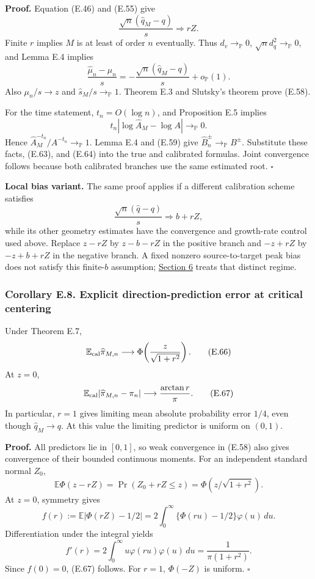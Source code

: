 \textbf{Proof.} Equation (E.46) and (E.55) give \[
\frac{\sqrt n(\widehat q_M-q)}s\Rightarrow rZ.
\tag{E.63}
\] Finite \(r\) implies \(M\) is at least of order \(n\) eventually.
Thus \(d_v\to_{\mathbb P}0\), \(\sqrt n d_q^2\to_{\mathbb P}0\), and
Lemma E.4 implies \[
\frac{\widehat\mu_n-\mu_n}s
=-\frac{\sqrt n(\widehat q_M-q)}s+o_{\mathbb P}(1).
\tag{E.64}
\] Also \(\mu_n/s\to z\) and \(\widehat s_M/s\to_{\mathbb P}1\). Theorem
E.3 and Slutsky's theorem prove (E.58).

For the time statement, \(t_n=O(\log n)\), and Proposition E.5 implies
\[
t_n|\log\widehat A_M-\log A|\to_{\mathbb P}0.
\] Hence \(\widehat A_M^{-t_n}/A^{-t_n}\to_{\mathbb P}1\). Lemma E.4 and
(E.59) give \(\widehat B_n^\pm\to_{\mathbb P}B^\pm\). Substitute these
facts, (E.63), and (E.64) into the true and calibrated formulas. Joint
convergence follows because both calibrated branches use the same
estimated root. \(\square\)

\textbf{Local bias variant.} The same proof applies if a different
calibration scheme satisfies \[
\frac{\sqrt n(\widehat q-q)}s\Rightarrow b+rZ,
\tag{E.65}
\] while its other geometry estimates have the convergence and
growth-rate control used above. Replace \(z-rZ\) by \(z-b-rZ\) in the
positive branch and \(-z+rZ\) by \(-z+b+rZ\) in the negative branch. A
fixed nonzero source-to-target peak bias does not satisfy this
finite-\(b\) assumption; \href{risk_boundaries.md}{Section 6} treats
that distinct regime.

\subsubsection{Corollary E.8. Explicit direction-prediction error at
critical
centering}\label{calibration-corollary-e.8.-explicit-direction-prediction-error-at-critical-centering}

Under Theorem E.7, \[
\mathbb E_{\rm cal}\widehat\pi_{M,n}
\longrightarrow
\Phi\!\left(\frac z{\sqrt{1+r^2}}\right).
\tag{E.66}
\] At \(z=0\), \[
\mathbb E_{\rm cal}|\widehat\pi_{M,n}-\pi_n|
\longrightarrow\frac{\arctan r}{\pi}.
\tag{E.67}
\] In particular, \(r=1\) gives limiting mean absolute probability error
\(1/4\), even though \(\widehat q_M\to q\). At this value the limiting
predictor is uniform on \((0,1)\).

\textbf{Proof.} All predictors lie in \([0,1]\), so weak convergence in
(E.58) also gives convergence of their bounded continuous moments. For
an independent standard normal \(Z_0\), \[
\mathbb E\Phi(z-rZ)
=\Pr(Z_0+rZ\le z)
=\Phi(z/\sqrt{1+r^2}).
\] At \(z=0\), symmetry gives \[
f(r):=\mathbb E|\Phi(rZ)-1/2|
=2\int_0^\infty\{\Phi(ru)-1/2\}\varphi(u)\,du.
\] Differentiation under the integral yields \[
f'(r)=2\int_0^\infty u\varphi(ru)\varphi(u)\,du
=\frac1{\pi(1+r^2)}.
\] Since \(f(0)=0\), (E.67) follows. For \(r=1\), \(\Phi(-Z)\) is
uniform. \(\square\)

